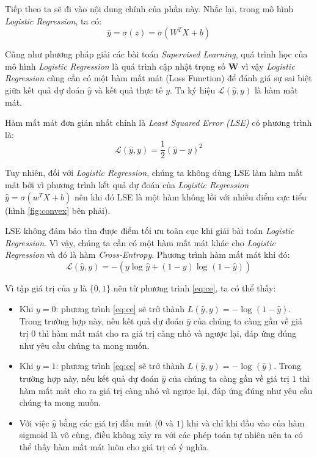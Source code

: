 Tiếp theo ta sẽ đi vào nội dung chính của phần này. Nhắc lại, trong mô hình \textit{Logistic Regression}, ta có:
\begin{equation*}
    \hat{y}= \sigma(z) = \sigma(W^TX + b) 
\end{equation*}

Cũng như phương pháp giải các bài toán \textit{Supervised Learning}, quá trình học của mô hình \textit{Logistic Regression} là quá trình cập nhật trọng số $\mathbf{W}$ vì vậy \textit{Logistic Regression} cũng cần có một hàm mất mát (Loss Function) để đánh giá sự sai biệt giữa kết quả dự đoán $\hat{y}$ và kết quả thực tế $y$. Ta ký hiệu $\mathcal{L}(\hat{y}, y)$ là hàm mất mát.

Hàm mất mát đơn giản nhất chính là \textit{Least Squared Error (LSE)} có phương trình là: 
\begin{equation*}
    \mathcal{L}(\hat{y}, y) = \frac{1}{2}(\hat{y} - y)^2
\end{equation*}

Tuy nhiên, đối với \textit{Logistic Regression}, chúng ta không dùng LSE làm hàm mất mát bởi vì phương trình kết quả dự đoán của \textit{Logistic Regression} $\hat{y} = \sigma(w^TX + b)$ nên khi đó LSE là một hàm không lồi với nhiều điểm cực tiểu (hình \ref{fig:convex} bên phải).

LSE không đảm bảo tìm được điểm tối ưu toàn cục khi giải bài toán \textit{Logistic Regression}. Vì vậy, chúng ta cần có một hàm mất mát khác cho \textit{Logistic Regression} và đó là hàm \textit{Cross-Entropy}. Phương trình hàm mất mát khi đó:
\begin{equation} \label{eq:ce}
    \mathcal{L}(\hat{y}, y) = -(y\log_{}{\hat{y}} + (1 - y)\log_{}{(1 - \hat{y})})
\end{equation}

Vì tập giá trị của $y$ là $\{0,1\}$ nên từ phương trình \eqref{eq:ce}, ta có thể thấy:
\begin{itemize}
    \item Khi $y = 0$: phương trình \eqref{eq:ce} sẽ trở thành $L(\hat{y}, y) = -\log_{}{(1 - \hat{y})}$. Trong trường hợp này, nếu kết quả dự đoán $\hat{y}$ của chúng ta càng gần về giá trị $0$ thì hàm mất mát cho ra giá trị càng nhỏ và ngược lại, đáp ứng đúng như yêu cầu chúng ta mong muốn.
    \item  Khi $y = 1$: phương trình \eqref{eq:ce} sẽ trở thành $L(\hat{y}, y) = -\log_{}{(\hat{y})}$. Trong trường hợp này, nếu kết quả dự đoán $\hat{y}$ của chúng ta càng gần về giá trị $1$ thì hàm mất mát cho ra giá trị càng nhỏ và ngược lại, đáp ứng đúng như yêu cầu chúng ta mong muốn.
    \item Với việc $\hat{y}$ bằng các giá trị đầu mút ($0$ và $1$) khi và chỉ khi đầu vào của hàm sigmoid là vô cùng, điều không xảy ra với các phép toán tự nhiên nên ta có thể thấy hàm mất mát luôn cho giá trị có ý nghĩa.
\end{itemize}

